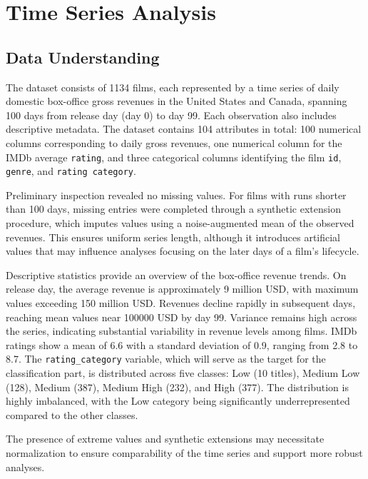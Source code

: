 \section{Time Series Analysis}

\subsection{Data Understanding}

The dataset consists of 1134 films, each represented by a time series of daily domestic 
box-office gross revenues in the United States and Canada, spanning 100 days from release day (day 0) 
to day 99. Each observation also includes descriptive metadata. The dataset contains 104 attributes in 
total: 100 numerical columns corresponding to daily gross revenues, one numerical column for the IMDb average \texttt{rating}, 
and three categorical columns identifying the film \texttt{id}, \texttt{genre}, and \texttt{rating category}.

Preliminary inspection revealed no missing values. For films with runs shorter than 100 days, 
missing entries were completed through a synthetic extension procedure, which imputes values using a noise-augmented mean 
of the observed revenues. This ensures uniform series length, although it introduces artificial values that may influence 
analyses focusing on the later days of a film’s lifecycle.

Descriptive statistics provide an overview of the box-office revenue trends. 
On release day, the average revenue is approximately 9 million USD, with maximum values exceeding 150 million USD. 
Revenues decline rapidly in subsequent days, reaching mean values near 100000 USD by day 99. 
Variance remains high across the series, indicating substantial variability in revenue levels among films.
IMDb ratings show a mean of 6.6 with a standard deviation of 0.9, ranging from 2.8 to 8.7.
The \texttt{rating\_category} variable, which will serve as the target for the classification part, 
is distributed across five classes: Low (10 titles), Medium Low (128), Medium (387), Medium High (232), and High (377). 
The distribution is highly imbalanced, with the Low category being significantly underrepresented compared to the other classes.


The presence of extreme values and synthetic extensions may necessitate normalization to ensure comparability 
of the time series and support more robust analyses.



